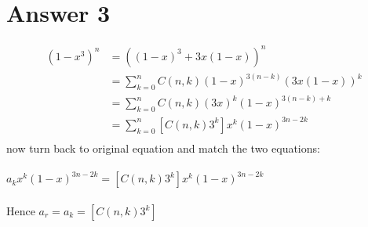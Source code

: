 \documentclass[12pt]{article}
\begin{document}
\section*{Answer 3}
\begin{align*}
 (1-x^3)^n &= ((1-x)^3 +3x(1-x))^n  \\
&=\sum_{k=0}^{n} C(n,k)(1-x)^{3(n-k)}(3x(1-x))^k \\
&=\sum_{k=0}^{n} C(n,k)(3x)^k(1-x)^{3(n-k)+k} \\
&= \sum_{k=0}^{n} [C(n,k)3^k]x^k(1-x)^{3n-2k} \\
\end{align*}
now turn back to original equation and match the two equations:\\\\
 $ a_kx^k(1-x)^{3n-2k} = [C(n,k)3^k]x^k(1-x)^{3n-2k} $ \\ 
\\
Hence $  a_r = a_k = [C(n,k)3^k] $
\end{document}
